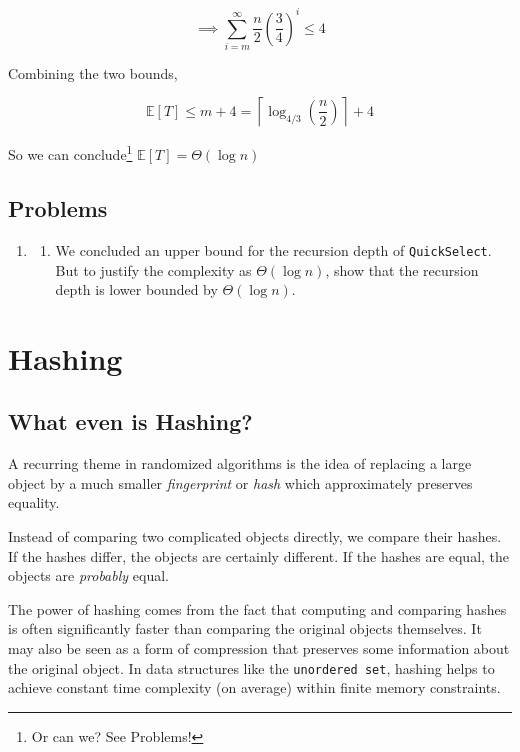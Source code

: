 \documentclass[11pt,openany]{book}
\begin{document}
\[
\implies
\sum_{i=m}^{\infty}
\frac n2\left(\frac34\right)^i
\le
4
\]

Combining the two bounds,

\[
\mathbb E[T]
\le
m+4
=
\left\lceil
\log_{4/3}\!\left(\frac n2\right)
\right\rceil
+4
\]

So we can conclude\footnote{Or can we? See Problems!} $\boxed{\mathbb E[T]=\Theta(\log n)}$


\section{Problems}

\begin{enumerate}
\item[\textbf{1}]
\begin{enumerate}[label=\textbf{(\alph*)}]
\item We concluded an upper bound for the recursion depth of \texttt{QuickSelect}. But to 
justify the complexity as $\Theta(\log n)$, show that the recursion depth is lower
bounded by $\Theta(\log n)$.

\end{enumerate}

\end{enumerate}

\chapter{Hashing}

\section{What even is Hashing?}

A recurring theme in randomized algorithms is the idea of replacing a large object by a much smaller \textit{fingerprint} or \textit{hash} which approximately preserves equality.

Instead of comparing two complicated objects directly, we compare their hashes.
If the hashes differ, the objects are certainly different.
If the hashes are equal, the objects are \emph{probably} equal.

The power of hashing comes from the fact that computing and comparing hashes is often significantly 
faster than comparing the original objects themselves. It may also be seen as a form of compression 
that preserves some information about the original object. In data structures like the \texttt{unordered set}, 
hashing helps to achieve constant time complexity (on average) within finite memory constraints.
\end{document}
